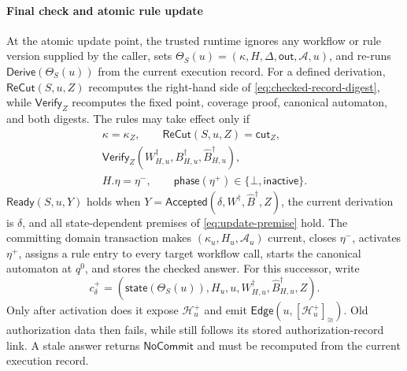 \paragraph{Final check and atomic rule update}
At the atomic update point, the trusted runtime ignores any workflow or rule version supplied by the caller, sets \(\Theta_S(u)=(\kappa,H,\Delta,\mathsf{out},\mathcal A,u)\), and re-runs \(\mathsf{Derive}(\Theta_S(u))\) from the current execution record.
For a defined derivation, \(\mathsf{ReCut}(S,u,Z)\) recomputes the right-hand side of \cref{eq:checked-record-digest}, while \(\mathsf{Verify}_Z\) recomputes the fixed point, coverage proof, canonical automaton, and both digests.
The rules may take effect only if
\begin{equation}
\label{eq:update-premise}
\begin{gathered}
 \kappa=\kappa_Z,\qquad
 \mathsf{ReCut}(S,u,Z)=\mathsf{cut}_Z,\\
 \mathsf{Verify}_Z(W^\dagger_{H,u},B^\dagger_{H,u},
    \widehat B^\dagger_{H,u}),\\
 H.\eta=\eta^-,\qquad
 \mathsf{phase}(\eta^+)\in\{\bot,\mathsf{inactive}\}.
\end{gathered}
\end{equation}
\(\mathsf{Ready}(S,u,Y)\) holds when \(Y=\mathsf{Accepted}(\delta,W^\dagger,\widehat B^\dagger,Z)\), the current derivation is \(\delta\), and all state-dependent premises of \cref{eq:update-premise} hold.
The committing domain transaction makes \((\kappa_u,H_u,\mathcal A_u)\) current, closes \(\eta^-\), activates \(\eta^+\), assigns a rule entry to every target workflow call, starts the canonical automaton at \(q^0\), and stores the checked answer.
For this successor, write
\[
c_\delta^+=
(\mathsf{state}(\Theta_S(u)),H_u,u,
 W^\dagger_{H,u},\widehat B^\dagger_{H,u},Z).
\]
Only after activation does it expose \(\mathcal H_u^+\) and emit \(\mathsf{Edge}(u,[\mathcal H_u^+]_{\cong})\).
Old authorization data then fails, while \Retry still follows its stored authorization-record link.
A stale answer returns \(\mathsf{NoCommit}\) and must be recomputed from the current execution record.

